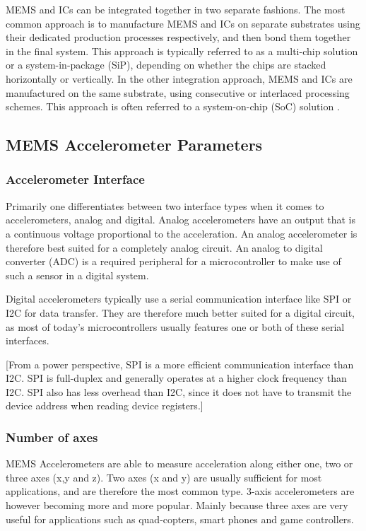 MEMS and ICs can be integrated together in two separate fashions. The most common approach is to manufacture MEMS and ICs on separate substrates using their dedicated production processes respectively, and then bond them together in the final system. This approach is typically referred to as a multi-chip solution or a system-in-package (SiP), depending on whether the chips are stacked horizontally or vertically. In the other integration approach, MEMS and ICs are manufactured on the same substrate, using consecutive or interlaced processing schemes. This approach is often referred to a system-on-chip (SoC) solution \cite{fischer15}. 

\subsection{MEMS Accelerometer Parameters}

\subsubsection{Accelerometer Interface}

Primarily one differentiates between two interface types when it comes to accelerometers, analog and digital. Analog accelerometers have an output that is a continuous voltage proportional to the acceleration. An analog accelerometer is therefore best suited for a completely analog circuit. An analog to digital converter (ADC) is a required peripheral for a microcontroller to make use of such a sensor in a digital system.

Digital accelerometers typically use a serial communication interface like SPI or I2C for data transfer. They are therefore much better suited for a digital circuit, as most of today's microcontrollers usually features one or both of these serial interfaces.

[From a power perspective, SPI is a more efficient communication interface than I2C. SPI is full-duplex and generally operates at a higher clock frequency than I2C. SPI also has less overhead than I2C, since it does not have to transmit the device address when reading device registers.] 

\subsubsection{Number of axes}
MEMS Accelerometers are able to measure acceleration along either one, two or three axes (x,y and z). Two axes (x and y) are usually sufficient for most applications, and are therefore the most common type. 3-axis accelerometers are however becoming more and more popular. Mainly because three axes are very useful for applications such as quad-copters, smart phones and game controllers.

